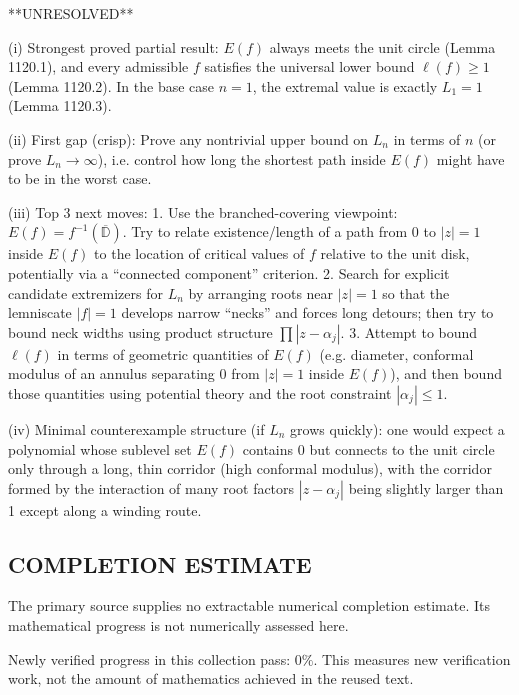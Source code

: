 **UNRESOLVED**

(i) Strongest proved partial result: \(E(f)\) always meets the unit circle (Lemma 1120.1), and every admissible \(f\) satisfies the universal lower bound \(\ell(f)\ge 1\) (Lemma 1120.2). In the base case \(n=1\), the extremal value is exactly \(L_1=1\) (Lemma 1120.3).

(ii) First gap (crisp): Prove any nontrivial upper bound on \(L_n\) in terms of \(n\) (or prove \(L_n\to\infty\)), i.e. control how long the shortest path inside \(E(f)\) might have to be in the worst case.

(iii) Top 3 next moves:
1. Use the branched-covering viewpoint: \(E(f)=f^{-1}(\overline{\mathbb{D}})\). Try to relate existence/length of a path from \(0\) to \(|z|=1\) inside \(E(f)\) to the location of critical values of \(f\) relative to the unit disk, potentially via a ``connected component'' criterion.
2. Search for explicit candidate extremizers for \(L_n\) by arranging roots near \(|z|=1\) so that the lemniscate \(|f|=1\) develops narrow ``necks'' and forces long detours; then try to bound neck widths using product structure \(\prod|z-\alpha_j|\).
3. Attempt to bound \(\ell(f)\) in terms of geometric quantities of \(E(f)\) (e.g. diameter, conformal modulus of an annulus separating \(0\) from \(|z|=1\) inside \(E(f)\)), and then bound those quantities using potential theory and the root constraint \(|\alpha_j|\le 1\).

(iv) Minimal counterexample structure (if \(L_n\) grows quickly): one would expect a polynomial whose sublevel set \(E(f)\) contains \(0\) but connects to the unit circle only through a long, thin corridor (high conformal modulus), with the corridor formed by the interaction of many root factors \(|z-\alpha_j|\) being slightly larger than 1 except along a winding route.


\subsection*{COMPLETION ESTIMATE}
The primary source supplies no extractable numerical completion estimate. Its mathematical progress is not numerically assessed here.

Newly verified progress in this collection pass: $0\%$. This measures new verification work, not the amount of mathematics achieved in the reused text.
